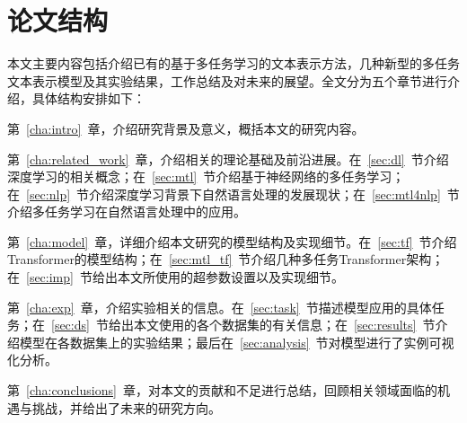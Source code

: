 \section{论文结构}

本文主要内容包括介绍已有的基于多任务学习的文本表示方法，几种新型的多任务文本表示模型及其实验结果，工作总结及对未来的展望。全文分为五个章节进行介绍，具体结构安排如下：

第~\ref{cha:intro}~章，介绍研究背景及意义，概括本文的研究内容。

第~\ref{cha:related_work}~章，介绍相关的理论基础及前沿进展。在~\ref{sec:dl}~节介绍深度学习的相关概念；在~\ref{sec:mtl}~节介绍基于神经网络的多任务学习；在~\ref{sec:nlp}~节介绍深度学习背景下自然语言处理的发展现状；在~\ref{sec:mtl4nlp}~节介绍多任务学习在自然语言处理中的应用。

第~\ref{cha:model}~章，详细介绍本文研究的模型结构及实现细节。在~\ref{sec:tf}~节介绍Transformer的模型结构；在~\ref{sec:mtl_tf}~节介绍几种多任务Transformer架构；在~\ref{sec:imp}~节给出本文所使用的超参数设置以及实现细节。

第~\ref{cha:exp}~章，介绍实验相关的信息。在~\ref{sec:task}~节描述模型应用的具体任务；在~\ref{sec:ds}~节给出本文使用的各个数据集的有关信息；在~\ref{sec:results}~节介绍模型在各数据集上的实验结果；最后在~\ref{sec:analysis}~节对模型进行了实例可视化分析。

第~\ref{cha:conclusions}~章，对本文的贡献和不足进行总结，回顾相关领域面临的机遇与挑战，并给出了未来的研究方向。

